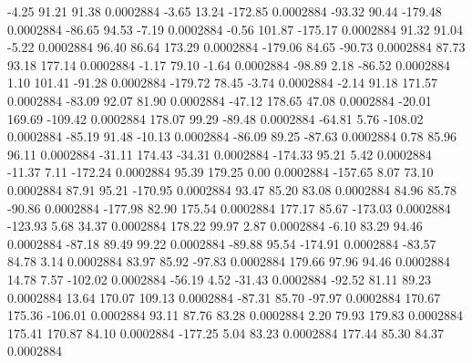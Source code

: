        -4.25       91.21       91.38     0.0002884
       -3.65       13.24     -172.85     0.0002884
      -93.32       90.44     -179.48     0.0002884
      -86.65       94.53       -7.19     0.0002884
       -0.56      101.87     -175.17     0.0002884
       91.32       91.04       -5.22     0.0002884
       96.40       86.64      173.29     0.0002884
     -179.06       84.65      -90.73     0.0002884
       87.73       93.18      177.14     0.0002884
       -1.17       79.10       -1.64     0.0002884
      -98.89        2.18      -86.52     0.0002884
        1.10      101.41      -91.28     0.0002884
     -179.72       78.45       -3.74     0.0002884
       -2.14       91.18      171.57     0.0002884
      -83.09       92.07       81.90     0.0002884
      -47.12      178.65       47.08     0.0002884
      -20.01      169.69     -109.42     0.0002884
      178.07       99.29      -89.48     0.0002884
      -64.81        5.76     -108.02     0.0002884
      -85.19       91.48      -10.13     0.0002884
      -86.09       89.25      -87.63     0.0002884
        0.78       85.96       96.11     0.0002884
      -31.11      174.43      -34.31     0.0002884
     -174.33       95.21        5.42     0.0002884
      -11.37        7.11     -172.24     0.0002884
       95.39      179.25        0.00     0.0002884
     -157.65        8.07       73.10     0.0002884
       87.91       95.21     -170.95     0.0002884
       93.47       85.20       83.08     0.0002884
       84.96       85.78      -90.86     0.0002884
     -177.98       82.90      175.54     0.0002884
      177.17       85.67     -173.03     0.0002884
     -123.93        5.68       34.37     0.0002884
      178.22       99.97        2.87     0.0002884
       -6.10       83.29       94.46     0.0002884
      -87.18       89.49       99.22     0.0002884
      -89.88       95.54     -174.91     0.0002884
      -83.57       84.78        3.14     0.0002884
       83.97       85.92      -97.83     0.0002884
      179.66       97.96       94.46     0.0002884
       14.78        7.57     -102.02     0.0002884
      -56.19        4.52      -31.43     0.0002884
      -92.52       81.11       89.23     0.0002884
       13.64      170.07      109.13     0.0002884
      -87.31       85.70      -97.97     0.0002884
      170.67      175.36     -106.01     0.0002884
       93.11       87.76       83.28     0.0002884
        2.20       79.93      179.83     0.0002884
      175.41      170.87       84.10     0.0002884
     -177.25        5.04       83.23     0.0002884
      177.44       85.30       84.37     0.0002884
